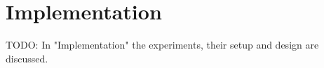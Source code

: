 \documentclass[Bachelorarbeit.tex]{subfiles}
\begin{document}
\chapter{Implementation}
TODO:
In "Implementation" the experiments, their setup and design are discussed.
\end{document}
